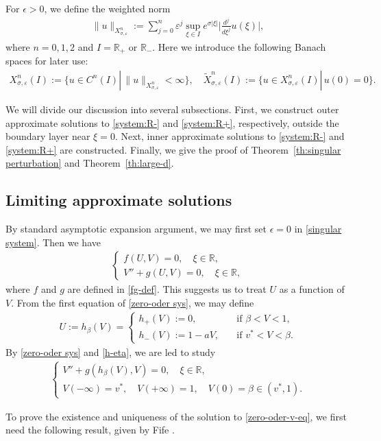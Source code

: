 \documentclass[11pt,a4paper]{article}
\numberwithin{equation}{section}
\numberwithin{figure}{section}
\newcommand\ep{\epsilon}
\newcommand\bea{\begin{eqnarray}}
\newcommand\eea{\end{eqnarray}}
\newcommand\beaa{\begin{eqnarray*}}
\newcommand\eeaa{\end{eqnarray*}}
\begin{document}
For $\ep>0$, we define the weighted norm
\beaa
\lVert u\lVert_{X^{n}_{\sigma,\varepsilon}}:=\sum_{j=0}^{n}\varepsilon^j\sup_{\xi\in I}e^{\sigma|\xi|}\Big|\frac{d^j}{d\xi^j} u(\xi)\Big|,
\eeaa
where $n=0,1,2$ and $I=\mathbb{R}_+$ or $\mathbb{R}_-$.
Here we introduce the following Banach spaces for later use:
\beaa
X^{n}_{\sigma,\varepsilon}(I):=\Big\{u\in C^{n}(I)|\, \lVert u\lVert_{X^{n}_{\sigma,\varepsilon}}<\infty \Big\},\quad
\widetilde{X}^{n}_{\sigma,\varepsilon}(I):=\Big\{u\in X^{n}_{\sigma,\varepsilon}(I)|\, u(0)=0\Big\}.
\eeaa


We will divide our discussion into several subsections.
First, we construct outer approximate solutions to \eqref{system:R-} and \eqref{system:R+}, respectively,
outside the boundary layer near $\xi=0$. Next, inner approximate solutions to \eqref{system:R-} and \eqref{system:R+} are constructed.
Finally, we give the proof of  Theorem~\ref{th:singular perturbation} and Theorem~\ref{th:large-d}.


\subsection{Limiting approximate solutions}

By standard asymptotic expansion argument, we may first set $\epsilon=0$ in \eqref{singular system}. Then
we have
\bea\label{zero-oder sys}
\begin{cases}
f(U,V)=0,\quad \xi\in\mathbb{R},\\
V''+g(U,V)=0,\quad \xi\in\mathbb{R},
\end{cases}
\eea
where $f$ and $g$ are defined in \eqref{fg-def}.
This suggests us to treat $U$ as a function of $V$.
From the first equation of \eqref{zero-oder sys}, we may define
\bea\label{h-eta}
U:=h_{\beta}(V)=
\begin{cases}
h_+(V):=0,&\quad \mbox{if $\beta<V<1$},\\
h_-(V):=1-aV,&\quad \mbox{if $v^*<V<\beta$}.
\end{cases}
\eea
By \eqref{zero-oder sys} and \eqref{h-eta}, we are led to study
\bea\label{zero-oder-v-eq}
\begin{cases}
V''+g(h_{\beta}(V),V)=0,\quad \xi\in\mathbb{R},\\
V(-\infty)=v^*,\quad V(+\infty)=1,\quad V(0)=\beta\in(v^*,1).
\end{cases}
\eea



To prove the existence and uniqueness of the solution to \eqref{zero-oder-v-eq}, we first need the following result, given by Fife \cite{Fife1973}.
\end{document}
